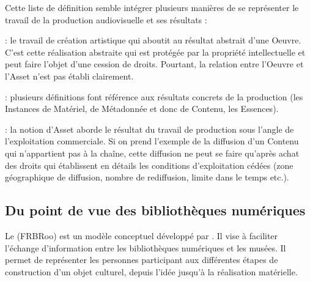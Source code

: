Cette liste de définition semble intégrer plusieurs manières de se représenter le travail de la production audiovisuelle et ses résultats :
\begin{liste} 

	\item[\g{artistique}] : le travail de création artistique qui aboutit au résultat abstrait d'une Oeuvre. 
	C'est cette réalisation abstraite qui est protégée par la propriété intellectuelle et peut faire l'objet d'une cession de droits.
	Pourtant, la relation entre l'Oeuvre et l'Asset n'est pas établi clairement.

	\item[\g{concrète}] : plusieurs définitions font référence aux résultats concrets de la production (les Instances de Matériel, de Métadonnée et donc de Contenu, les Essences).

	\item[\g{commerciale}] : la notion d'Asset aborde le résultat du travail de production sous l'angle de l'exploitation commerciale. 
	Si on prend l'exemple de la diffusion d'un Contenu qui n'appartient pas à la chaîne, cette diffusion ne peut se faire qu'après achat des droits qui établissent en détails les conditions d'exploitation cédées (zone géographique de diffusion, nombre de rediffusion, limite dans le temps etc.).
	
\end{liste}



\subsection{Du point de vue des bibliothèques numériques}
Le  (FRBRoo) est un modèle conceptuel développé par \cite{Aalberg2008}.
Il vise à faciliter l’échange d’information entre les bibliothèques numériques et les musées. 
Il permet de représenter les personnes participant aux différentes étapes de construction d’un objet culturel, depuis l’idée jusqu’à la réalisation matérielle.

